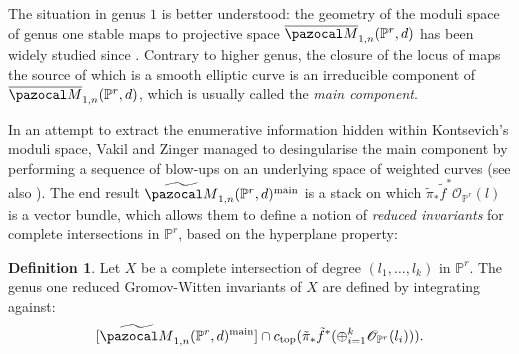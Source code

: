 \documentclass[11pt]{amsart}
\newcommand{\M}[4]{\overline{\pazocal M}_{#1,#2}(#3,#4)}
\newcommand{\PP}{\mathbb P}
\renewcommand{\to}{\rightarrow}
\newcommand{\bcd}{\begin{center}\begin{tikzcd}}
\newcommand{\ecd}{\end{tikzcd}\end{center}}
\theoremstyle{plain}
\theoremstyle{definition}
\newtheorem{dfn}[thm]{Definition}
\begin{document}
The situation in genus $1$ is better understood: the geometry of the moduli space of genus one stable maps to projective space $\M{1}{n}{\PP^r}{d}$ has been widely studied since \cite{Vre}. Contrary to higher genus, the closure of the locus of maps the source of which is a smooth elliptic curve is an irreducible component of $\M{1}{n}{\PP^r}{d}$, which is usually called the \emph{main component}.

In an attempt to extract the enumerative information hidden within Kontsevich's moduli space, Vakil and Zinger managed to desingularise the main component by performing a sequence of blow-ups on an underlying space of weighted curves \cite{VZpreview} \cite{VZ} (see also \cite{HL}). The end result $\widetilde{\pazocal M}_{1,n}(\PP^r,d)^{\rm{main}}$ is a stack on which $\tilde\pi_*\tilde f^*\mathcal O_{\PP^r}(l)$ is a vector bundle, which allows them to define a notion of \emph{reduced invariants} for complete intersections in $\PP^r$, based on the hyperplane property:  %
\begin{dfn}
Let $X$ be a complete intersection of degree $(l_1,\ldots,l_k)$ in $\PP^r$. The genus one reduced Gromov-Witten invariants of $X$ are defined by integrating against: $$[\widetilde{\pazocal M}_{1,n}(\PP^r,d)^{\rm{main}}]\cap c_{\rm{top}}(\tilde\pi_*\tilde f^*(\oplus_{i=1}^k\mathcal O_{\PP^r}(l_i))).$$
\end{dfn}
\end{document}
